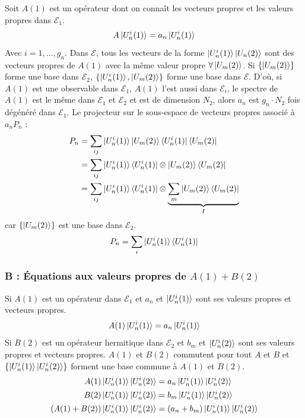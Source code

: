 \documentclass[12pt,a4paper,titlepage]{book}
\begin{document}
Soit $A(1)$ est un opérateur dont on connaît les vecteurs propres et les valeurs propres dans $\mathcal{E}_1$.
\begin{equation*}
A \ket{U_n^i (1)} = a_n \ket{U_n^i (1)}
\end{equation*}
Avec $i = 1, \ldots, g_n$. Dans $\mathcal{E}$, tous les vecteurs de la forme $\ket{U_n^i (1)} \ket{U_n (2)}$ sont des vecteurs propres de $A(1)$ avec la même valeur propre $\forall \ket{U_m (2)}$. Si $\lbrace \ket{U_m (2)} \rbrace$ forme une base dans $\mathcal{E}_2$, $\lbrace \ket{U_n^i (1)}, \ket{U_m (2)} \rbrace$ forme une base dans $\mathcal{E}$. D'où, si $A(1)$ est une observable dans $\mathcal{E}_1$, $A(1)$ l'est aussi dans $\mathcal{E}_i$, le spectre de $A(1)$ est le même dans $\mathcal{E}_1$ et $\mathcal{E}_2$ et est de dimension $N_2$, alors $a_n$ est $g_n \cdot N_2$ fois dégénéré dans $\mathcal{E}_1$. Le projecteur sur le sous-espace de vecteurs propres associé à $a_n P_n$ :
\begin{align*}
P_n &= \sum\limits_{i j} \ket{U_n^i (1)} \ket{U_m (2)} \bra{U_n^i (1)} \bra{U_m (2)}\\
&= \sum\limits_{i j} \ket{U_n^i (1)} \bra{U_n^i (1)} \otimes \ket{U_m (2)} \bra{U_m (2)} \\
&= \sum\limits_{i j} \ket{U_n^i (1)} \bra{U_n^i (1)} \otimes \underbrace{\sum\limits_m \ket{U_m (2)} \bra{U_m (2)}}_{I}
\end{align*}
car $\lbrace \ket{U_m (2)} \rbrace$ est une base dans $\mathcal{E}_2$.
\begin{equation*}
P_n = \sum\limits_i \ket{U_n^i (1)} \bra{U_n^i (1)}
\end{equation*}

\subsubsection{B : Équations aux valeurs propres de $A(1) + B(2)$}

Si $A(1)$ est un opérateur dans $\mathcal{E}_1$ et $a_n$ et $\ket{U_n^i (1)}$ sont ses valeurs propres et vecteurs propres.
\begin{equation*}
A(1) \ket{U_n^i (1)} = a_n \ket{U_n^i (1)}
\end{equation*}
Si $B(2)$ est un opérateur hermitique dans $\mathcal{E}_2$ et $b_m$ et $\ket{U_n^i (2)}$ sont ses valeurs propres et vecteurs propres. $A(1)$ et $B(2)$ commutent pour tout $A$ et $B$ et $\lbrace \ket{U_n^i (1)} \ket{U_n^i (2)} \rbrace$ forment une base commune à $A(1)$ et $B(2)$.
\begin{align*}
A(1) \ket{U_n^i (1)} \ket{U_n^i (2)} &= a_n \ket{U_n^i (1)} \ket{U_n^i (2)}\\
B(2) \ket{U_n^i (1)} \ket{U_n^i (2)} &= b_m \ket{U_n^i (1)} \ket{U_n^i (2)}\\
(A(1) + B(2)) \ket{U_n^i (1)} \ket{U_n^i (2)} &= (a_n + b_m) \ket{U_n^i (1)} \ket{U_n^i (2)}
\end{align*}
\end{document}
